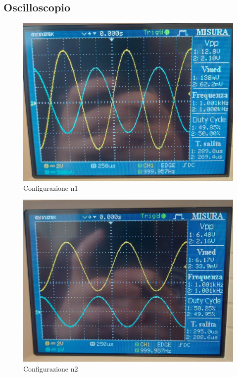 \documentclass[12pt]{article}
\begin{document}
\subsection{Oscilloscopio}
\begin{figure}[h]
    \centering
    \includegraphics[scale=0.1]{osc1.jpg}
    \caption{Configurazione n1}
\end{figure}
\begin{figure}[h]
    
    \centering
    \includegraphics[scale=0.1]{osc2.jpg}
    \caption{Configurazione n2}
\end{figure}
\end{document}
